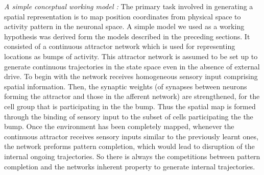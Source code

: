 \emph{A simple conceptual working model : }
The primary task involved in generating a spatial representation is to map position coordinates from physical space to activity pattern in the neuronal space. A simple model we used as a working hypothesis was derived form the models described in the preceding sections. It consisted of a continuous attractor network which is used for representing locations as bumps of activity. This attractor network is assumed to be set up to generate continuous trajectories in the state space even in the absence of external drive. To begin with the network receives homogeneous sensory input comprising spatial information. Then, the synaptic weights (of synapses between neurons forming the attractor and those in the afferent network) are strengthened, for the cell group that is participating in the the bump. Thus the spatial map is formed through the binding of sensory input to the subset of cells participating the the bump. Once the environment has been completely mapped, whenever the continuous attractor receives sensory inputs similar to the previously learnt ones, the network preforms pattern completion, which would lead to disruption of the internal ongoing trajectories. So there is always the competitions between pattern completion and the networks inherent property to generate internal trajectories. 